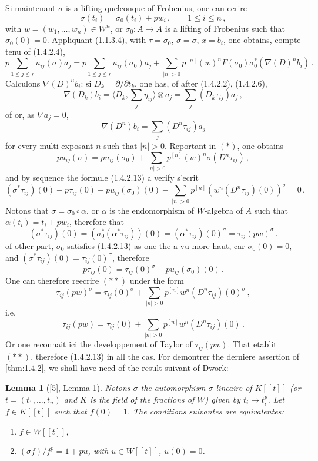 \documentclass[12pt,a4paper]{article}
\theoremstyle{plain}
\newtheorem{lemma}[theorem]{Lemma}
\theoremstyle{definition}
\theoremstyle{remark}
\begin{document}
Si maintenant $\sigma$ is a lifting quelconque of Frobenius, one can ecrire
\[
\sigma(t_i) = \sigma_0(t_i) + pw_i\,, \qquad 1 \leq i \leq n\,,
\]
with $w = (w_1, \ldots, w_n) \in W^n$, or $\sigma_0 : A \to A$ is a lifting of Frobenius such that $\sigma_0(0) = 0$. Appliquant (1.1.3.4), with $\tau = \sigma_0$, $\sigma = \sigma$, $x = b_i$, one obtains, compte tenu of (1.4.2.4),
\begin{equation}\tag{$*$}
p\sum_{1 \leq j \leq r} u_{ij}(\sigma)a_j = p\sum_{1 \leq j \leq r} u_{ij}(\sigma_0)a_j + \sum_{|n|>0} p^{[n]}(w)^n F(\sigma_0)\sigma_0^*(\nabla(D)^nb_i)\,.\end{equation}
Calculons $\nabla(D)^nb_i$: si $D_k = \partial/\partial t_k$, one has, of after (1.4.2.2), (1.4.2.6),
\[
\nabla(D_k)b_i = \langle D_k, \sum_j \eta_{ij} \rangle \otimes a_j = \sum_j (D_k\tau_{ij})a_j\,,
\]
of or, as $\nabla a_j = 0$,
\[
\nabla(D^n)b_i = \sum_j (D^n\tau_{ij})a_j
\]
for every multi-exposant $n$ such that $|n| > 0$. Reportant in $(*)$, one obtains
\[
pu_{ij}(\sigma) = pu_{ij}(\sigma_0) + \sum_{|n|>0} p^{[n]}(w)^n\sigma(D^n\tau_{ij})\,,
\]
and by sequence the formule (1.4.2.13) a verify s'ecrit
\begin{equation}\tag{$**$}
(\sigma^*\tau_{ij})(0) - p\tau_{ij}(0) - pu_{ij}(\sigma_0)(0) - \sum_{|n|>0} p^{[n]}(w^n(D^n\tau_{ij})(0))^\sigma = 0\,.\end{equation}
Notons that $\sigma = \sigma_0 \circ \alpha$, or $\alpha$ is the endomorphism of $W$-algebra of $A$ such that $\alpha(t_i) = t_i + pw_i$, therefore that
\[
(\sigma^*\tau_{ij})(0) = (\sigma_0^*(\alpha^*\tau_{ij}))(0) = (\alpha^*\tau_{ij})(0)^\sigma = \tau_{ij}(pw)^\sigma\,.\]
of other part, $\sigma_0$ satisfies (1.4.2.13) as one the a vu more haut, car $\sigma_0(0) = 0$, and $(\sigma^*\tau_{ij})(0) = \tau_{ij}(0)^\sigma$, therefore
\[
p\tau_{ij}(0) = \tau_{ij}(0)^\sigma - pu_{ij}(\sigma_0)(0)\,.\]
One can therefore reecrire $(**)$ under the form
\[
\tau_{ij}(pw)^\sigma = \tau_{ij}(0)^\sigma + \sum_{|n|>0} p^{[n]}w^n(D^n\tau_{ij})(0)^\sigma\,,
\]
i.e.
\[
\tau_{ij}(pw) = \tau_{ij}(0) + \sum_{|n|>0} p^{[n]}w^n(D^n\tau_{ij})(0)\,.\]
Or one reconnait ici the developpement of Taylor of $\tau_{ij}(pw)$. That etablit $(**)$, therefore (1.4.2.13) in all the cas. For demontrer the derniere assertion of \ref{thm:1.4.2}, we shall have need of the result suivant of Dwork:

\begin{lemma}[{[5], Lemma 1}]\label{lem:1.4.3}
Notons $\sigma$ the automorphism $\sigma$-lineaire of $K[[t]]$ (or $t = (t_1, \ldots, t_n)$ and $K$ is the field of the fractions of $W$) given by $t_i \mapsto t_i^p$. Let $f \in K[[t]]$ such that $f(0) = 1$. The conditions suivantes are equivalentes:
\begin{enumerate}[label=(\roman*)]
\item $f \in W[[t]]$,
\item $(\sigma f)/f^p = 1 + pu$, with $u \in W[[t]]$, $u(0) = 0$.
\end{enumerate}
\end{lemma}
\end{document}
